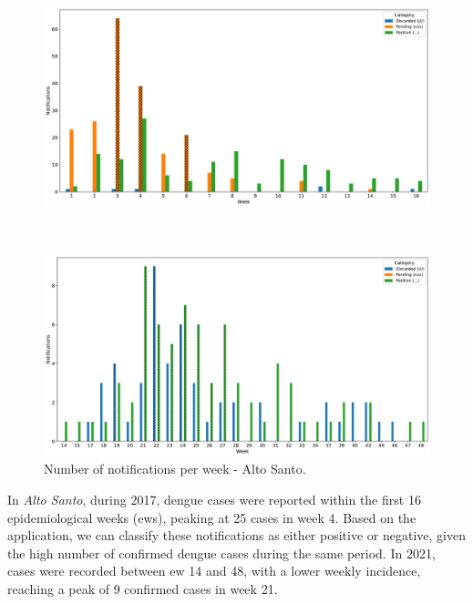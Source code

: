 \begin{figure}[h!]
  \begin{minipage}[c]{.9\textwidth}
    \centering
    \includegraphics[scale=0.32]{images/cases-per-week--2017-Alto Santo.pdf}
  \end{minipage}
  \\
  \begin{minipage}[c]{.9\textwidth}
    \centering
    \includegraphics[scale=0.32]{images/cases-per-week--2021-Alto Santo.pdf}
  \end{minipage}
  \caption{\label{fig:cases-per-week-as} Number of notifications per week - Alto Santo.}
\end{figure}

In \textit{Alto Santo}, during 2017, dengue cases were reported within the first 16 epidemiological weeks (\gls{ews}), peaking at 25 cases in week 4. Based on the application, we can classify these notifications as either positive or negative, given the high number of confirmed dengue cases during the same period. In 2021, cases were recorded between \gls{ew} 14 and 48, with a lower weekly incidence, reaching a peak of 9 confirmed cases in week 21.


